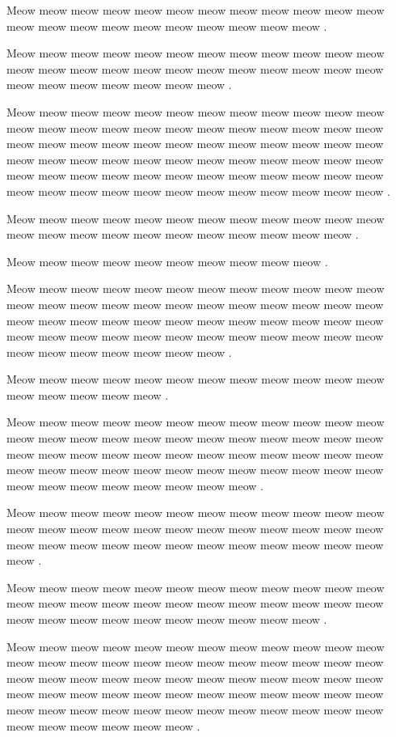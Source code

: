 \documentclass[12pt, a5paper, openany]{book}
\begin{document}
Meow meow meow meow meow meow meow meow meow meow meow meow meow meow meow meow meow meow meow meow meow meow .

Meow meow meow meow meow meow meow meow meow meow meow meow meow meow meow meow meow meow meow meow meow meow meow meow meow meow meow meow meow meow meow .

Meow meow meow meow meow meow meow meow meow meow meow meow meow meow meow meow meow meow meow meow meow meow meow meow meow meow meow meow meow meow meow meow meow meow meow meow meow meow meow meow meow meow meow meow meow meow meow meow meow meow meow meow meow meow meow meow meow meow meow meow meow meow meow meow meow meow meow meow meow meow meow meow .

Meow meow meow meow meow meow meow meow meow meow meow meow meow meow meow meow meow meow meow meow meow meow meow .

Meow meow meow meow meow meow meow meow meow meow .

Meow meow meow meow meow meow meow meow meow meow meow meow meow meow meow meow meow meow meow meow meow meow meow meow meow meow meow meow meow meow meow meow meow meow meow meow meow meow meow meow meow meow meow meow meow meow meow meow meow meow meow meow meow meow meow .

Meow meow meow meow meow meow meow meow meow meow meow meow meow meow meow meow meow .

Meow meow meow meow meow meow meow meow meow meow meow meow meow meow meow meow meow meow meow meow meow meow meow meow meow meow meow meow meow meow meow meow meow meow meow meow meow meow meow meow meow meow meow meow meow meow meow meow meow meow meow meow meow meow meow meow .

Meow meow meow meow meow meow meow meow meow meow meow meow meow meow meow meow meow meow meow meow meow meow meow meow meow meow meow meow meow meow meow meow meow meow meow meow meow .

Meow meow meow meow meow meow meow meow meow meow meow meow meow meow meow meow meow meow meow meow meow meow meow meow meow meow meow meow meow meow meow meow meow meow .

Meow meow meow meow meow meow meow meow meow meow meow meow meow meow meow meow meow meow meow meow meow meow meow meow meow meow meow meow meow meow meow meow meow meow meow meow meow meow meow meow meow meow meow meow meow meow meow meow meow meow meow meow meow meow meow meow meow meow meow meow meow meow meow meow meow meow .
\end{document}
